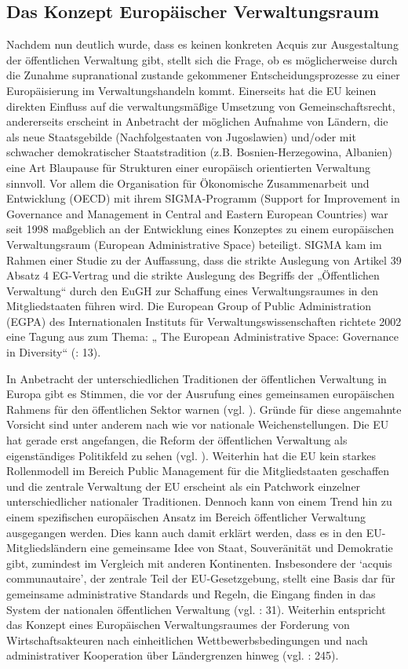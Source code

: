 \subsection{Das Konzept Europäischer Verwaltungsraum}
Nachdem nun deutlich wurde, dass es keinen konkreten Acquis zur Ausgestaltung der öffentlichen Verwaltung gibt, stellt sich die Frage, ob es möglicherweise durch die Zunahme supranational zustande gekommener Entscheidungsprozesse zu einer Europäisierung im Verwaltungshandeln kommt. Einerseits hat die EU keinen direkten Einfluss auf die verwaltungsmäßige Umsetzung von Gemeinschaftsrecht, andererseits erscheint in Anbetracht der möglichen Aufnahme von Ländern, die als neue Staatsgebilde (Nachfolgestaaten von Jugoslawien) und/oder mit schwacher demokratischer Staatstradition (z.B. Bosnien-Herzegowina, Albanien) eine Art Blaupause für Strukturen einer europäisch orientierten Verwaltung sinnvoll. Vor allem die Organisation für Ökonomische Zusammenarbeit und Entwicklung (OECD) mit ihrem SIGMA-Programm (Support for Improvement in Governance and Management in Central and Eastern European Countries) war seit 1998 maßgeblich an der Entwicklung eines Konzeptes zu einem europäischen Verwaltungsraum (European Administrative Space) beteiligt. SIGMA kam im Rahmen einer Studie zu der Auffassung, dass die strikte Auslegung von Artikel 39 Absatz 4 EG-Vertrag und die strikte Auslegung des Begriffs der „Öffentlichen Verwaltung“ durch den EuGH zur Schaffung eines Verwaltungsraumes in den Mitgliedstaaten führen wird. Die European Group of Public Administration (EGPA) des Internationalen Instituts für Verwaltungswissenschaften richtete 2002 eine Tagung aus zum Thema: „ The European Administrative Space: Governance in Diversity“ (\cite{mangenot}: 13).\par
In Anbetracht der unterschiedlichen Traditionen der öffentlichen Verwaltung in Europa gibt es Stimmen, die vor der Ausrufung eines gemeinsamen europäischen Rahmens für den öffentlichen Sektor warnen (vgl. \cite{olsen}). Gründe für diese angemahnte Vorsicht sind unter anderem nach wie vor nationale Weichenstellungen. Die EU hat gerade erst angefangen, die Reform der öffentlichen Verwaltung als eigenständiges Politikfeld zu sehen (vgl. \cite{schmar}). Weiterhin hat die EU kein starkes Rollenmodell im Bereich Public Management für die Mitgliedstaaten geschaffen und die zentrale Verwaltung der EU erscheint als ein Patchwork einzelner unterschiedlicher nationaler Traditionen. Dennoch kann von einem Trend hin zu einem spezifischen europäischen Ansatz im Bereich öffentlicher Verwaltung ausgegangen werden. Dies kann auch damit erklärt werden, dass es in den EU-Mitgliedsländern eine gemeinsame Idee von Staat, Souveränität und Demokratie gibt, zumindest im Vergleich mit anderen Kontinenten. Insbesondere der ‘acquis communautaire’, der zentrale Teil der EU-Gesetzgebung, stellt eine Basis dar für gemeinsame administrative Standards und Regeln, die Eingang finden in das System der nationalen öffentlichen Verwaltung (vgl. \cite{raarut}: 31). Weiterhin entspricht das Konzept eines Europäischen Verwaltungsraumes der Forderung von Wirtschaftsakteuren nach einheitlichen Wettbewerbsbedingungen und nach administrativer Kooperation über Ländergrenzen hinweg (vgl. \cite{bogjan}: 245). \par
